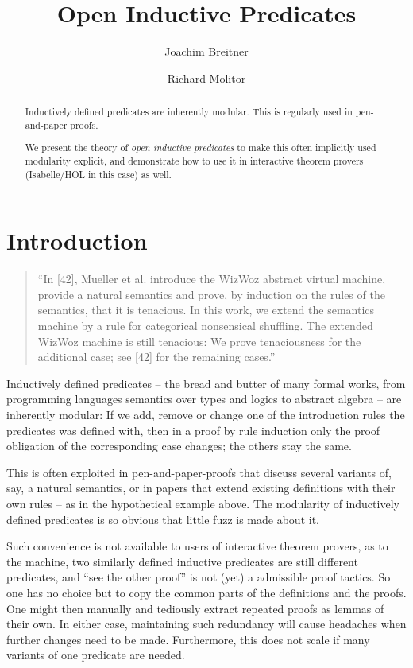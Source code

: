 \documentclass{llncs}
\title{Open Inductive Predicates}
\author{Joachim Breitner \and Richard Molitor}
\institute{Karlsruhe Institute of Technology}
\begin{document}
\maketitle

\begin{abstract}
Inductively defined predicates are inherently modular. This is regularly used in pen-and-paper proofs.

We present the theory of \emph{open inductive predicates} to make this often implicitly used modularity explicit, and demonstrate how to use it in interactive theorem provers (Isabelle/HOL in this case) as well.
\end{abstract}

\section{Introduction}

\begin{quote}
“In [42], Mueller et al. introduce the WizWoz abstract virtual machine, provide a natural semantics and prove, by induction on the rules of the semantics, that it is tenacious. In this work, we extend the semantics machine by a rule for categorical nonsensical shuffling. The extended WizWoz machine is still tenacious: We prove tenaciousness for the additional case; see [42] for the remaining cases.”
\end{quote}

Inductively defined predicates -- the bread and butter of many formal works, from programming languages semantics over types and logics to abstract algebra -- are inherently modular: If we add, remove or change one of the introduction rules the predicates was defined with, then in a proof by rule induction only the proof obligation of the corresponding case changes; the others stay the same.

This is often exploited in pen-and-paper-proofs that discuss several variants of, say, a natural semantics, or in papers that extend existing definitions with their own rules -- as in the hypothetical example above. The modularity of inductively defined predicates is so obvious that little fuzz is made about it.

Such convenience is not available to users of interactive theorem provers, as to the machine, two similarly defined inductive predicates are still different predicates, and “see the other proof” is not (yet) a admissible proof tactics. So one has no choice but to copy the common parts of the definitions and the proofs. One might then manually and tediously extract repeated proofs as lemmas of their own. In either case, maintaining such redundancy will cause headaches when further changes need to be made. Furthermore, this does not scale if many variants of one predicate are needed.
\end{document}
